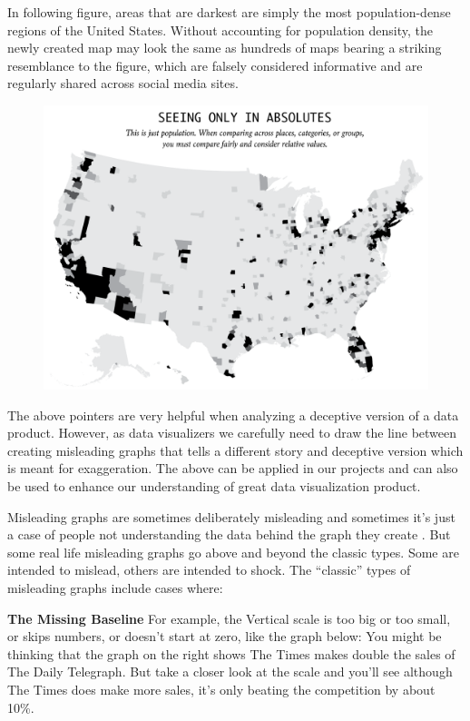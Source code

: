 \documentclass[]{book}
\theoremstyle{definition}
\theoremstyle{definition}
\theoremstyle{definition}
\theoremstyle{remark}
\begin{document}
In following figure, areas that are darkest are simply the most
population-dense regions of the United States. Without accounting for
population density, the newly created map may look the same as hundreds
of maps bearing a striking resemblance to the figure, which are falsely
considered informative and are regularly shared across social media
sites.

\begin{figure}
\centering
\includegraphics{images/Maps1.png}
\caption{}
\end{figure}

The above pointers are very helpful when analyzing a deceptive version
of a data product. However, as data visualizers we carefully need to
draw the line between creating misleading graphs that tells a different
story and deceptive version which is meant for exaggeration. The above
can be applied in our projects and can also be used to enhance our
understanding of great data visualization product.

Misleading graphs are sometimes deliberately misleading and sometimes
it's just a case of people not understanding the data behind the graph
they create \citep{andale_2014}. But some real life misleading graphs go
above and beyond the classic types. Some are intended to mislead, others
are intended to shock. The ``classic'' types of misleading graphs
include cases where:

\textbf{The Missing Baseline} For example, the Vertical scale is too big
or too small, or skips numbers, or doesn't start at zero, like the graph
below: You might be thinking that the graph on the right shows The Times
makes double the sales of The Daily Telegraph. But take a closer look at
the scale and you'll see although The Times does make more sales, it's
only beating the competition by about 10\%.
\end{document}

